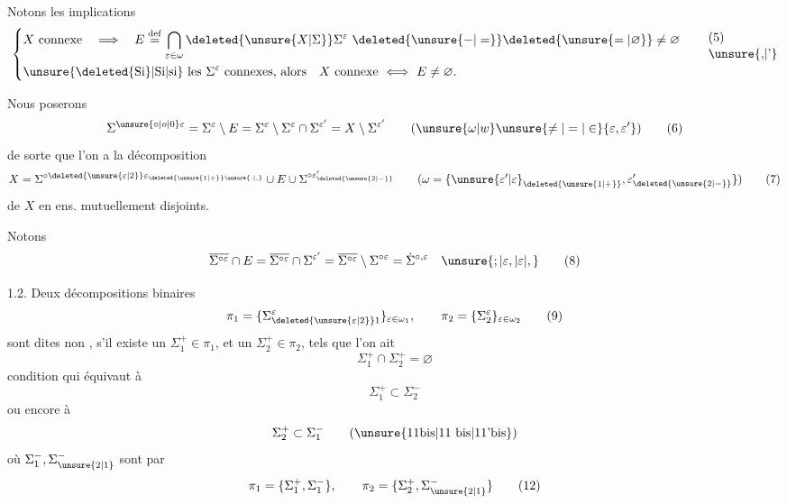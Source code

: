 \begingroup
\makeatletter\tagsleft@true\makeatother
Notons les implications
\[
\left\{\begin{aligned}
&X\ \text{connexe}\quad\Longrightarrow\quad E\overset{\mathrm{def}}{=}\bigcap_{\varepsilon\in\omega}\deleted{\unsure{X|\Sigma}}\Sigma^\varepsilon\ \deleted{\unsure{-|=}}\deleted{\unsure{=|\varnothing}}\ne\varnothing\\
&\text{\unsure{\deleted{Si}|Si|si} les }\Sigma^\varepsilon\ \text{connexes, alors}\quad X\ \text{connexe}\ \Longleftrightarrow\ E\ne\varnothing.
\end{aligned}\right.\tag*{\shortstack[l]{(5)\\\unsure{,|'}}}
\]

Nous poserons
\[
\Sigma^{\unsure{\circ|o|0}\varepsilon}=\Sigma^\varepsilon\setminus E=\Sigma^\varepsilon\setminus\Sigma^\varepsilon\cap\Sigma^{\varepsilon'}=X\setminus\Sigma^{\varepsilon'}\qquad(\unsure{\omega|w}\unsure{\ne|=|\in}\{\varepsilon,\varepsilon'\})\tag*{(6)}
\]
de sorte que l'on a la décomposition
\[
X=\Sigma^{\circ\deleted{\unsure{\varepsilon|2}}\varepsilon_{\deleted{\unsure{1|+}}\unsure{.|,}}}\cup E\cup\Sigma^{\circ\varepsilon'_{\deleted{\unsure{2|-}}}}\qquad(\omega=\{\unsure{\varepsilon'|\varepsilon}_{\deleted{\unsure{1|+}}},\varepsilon'_{\deleted{\unsure{2|-}}}\})\tag*{(7)}
\]
de $X$ en  ens. mutuellement disjoints.

Notons
\[
\overline{\Sigma^{\circ\varepsilon}}\cap E=\overline{\Sigma^{\circ\varepsilon}}\cap\Sigma^{\varepsilon'}=\overline{\Sigma^{\circ\varepsilon}}\setminus\Sigma^{\circ\varepsilon}=\dot{\Sigma}^{\circ,\varepsilon}\quad\unsure{;|\varepsilon,|\varepsilon|,}\tag*{(8)}
\]

\par
{}

1.2. Deux décompositions binaires
\[
\pi_1=\{\Sigma_{\deleted{\unsure{\varepsilon|2}}1}^\varepsilon\}_{\varepsilon\in\omega_1},\qquad\pi_2=\{\Sigma_2^\varepsilon\}_{\varepsilon\in\omega_2}\tag*{(9)}
\]
sont dites non \uline{},  s'il existe un  $\Sigma_1^+\in\pi_1$, et un $\Sigma_2^+\in\pi_2$, tels que l'on ait
\[
\Sigma_1^+\cap\Sigma_2^+=\varnothing\tag*{(10)}
\]
condition qui équivaut à
\[
\Sigma_1^+\subset\Sigma_2^-\tag*{(11)}
\]
ou encore à
\[
\Sigma_2^+\subset\Sigma_1^-\tag*{(\unsure{11bis|11 bis|11'bis})}
\]
où $\Sigma_1^-,\Sigma_{\unsure{2|1}}^-$ sont  par
\[
\pi_1=\{\Sigma_1^+,\Sigma_1^-\},\qquad\pi_2=\{\Sigma_2^+,\Sigma_{\unsure{2|1}}^-\}\tag*{(12)}
\]
\endgroup

